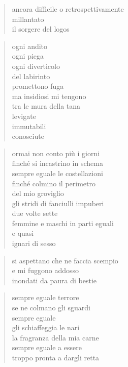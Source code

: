 	\begin{verse}
		ancora difficile o retrospettivamente\\
		millantato\\
		il sorgere del logos
	\end{verse}

\clearpage


\vspace*{2cm}

	\begin{verse}
		ogni andito\\
		ogni piega\\
		ogni diverticolo\\
		del labirinto\\
		promettono fuga\\
		ma insidiosi mi tengono\\
		tra le mura della tana\\
		levigate\\
		immutabili\\
		conosciute
	\end{verse}

	\begin{verse}
		ormai non conto più i giorni\\
		finché si incastrino in schema\\
		sempre eguale le costellazioni\\
		finché colmino il perimetro\\
		del mio groviglio\\
		gli stridi di fanciulli impuberi\\
		due volte sette\\
		femmine e maschi in parti eguali\\
		e quasi\\
		ignari di sesso
	\end{verse}

	\begin{verse}
		si aspettano che ne faccia scempio\\
		e mi fuggono addosso\\
		inondati da paura di bestie
	\end{verse}

	\begin{verse}
		sempre eguale terrore\\
		se ne colmano gli sguardi\\
		sempre eguale\\
		gli schiaffeggia le nari\\
		la fragranza della mia carne\\
		sempre eguale a essere\\
		troppo pronta a dargli retta
	\end{verse}

